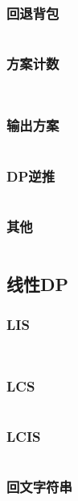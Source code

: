 \documentclass[a4paper,11pt]{article}
\begin{document}
\subsubsection{回退背包} %
\inputminted[breaklines]{c++}{dp/bag/huitui.cpp}
\newpage %
\subsubsection{方案计数} %
\inputminted[breaklines]{c++}{dp/bag/count1.cpp}
\inputminted[breaklines]{c++}{dp/bag/count2.cpp}
\newpage %
\subsubsection{输出方案} %
\inputminted[breaklines]{c++}{dp/bag/getMethod.cpp}
\newpage %
\subsubsection{DP逆推} %
\inputminted[breaklines]{c++}{dp/bag/inv.cpp}
\newpage %
\subsubsection{其他} %
\inputminted[breaklines]{c++}{dp/bag/special.cpp}

\newpage %
\subsection{线性DP} %

\subsubsection{LIS} %
\inputminted[breaklines]{c++}{dp/线性dp/LIS1.cpp}
\inputminted[breaklines]{c++}{dp/线性dp/LIS2.cpp}
\newpage %
\subsubsection{LCS} %
\inputminted[breaklines]{c++}{dp/线性dp/LCS.cpp}
\newpage %
\subsubsection{LCIS} %
\inputminted[breaklines]{c++}{dp/线性dp/LCIS.cpp}
\newpage %
\subsubsection{回文字符串} %
\inputminted[breaklines]{c++}{dp/线性dp/string.cpp}
\newpage %
\end{document}
